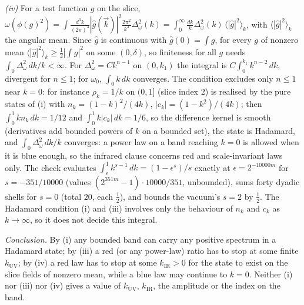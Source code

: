 \emph{(iv)} For a test function $g$ on the slice, $\omega(\phi(g)^{2}) = \int\frac{d^{3}k}{(2\pi)^{3}}|\hat g(\vec k)|^{2}\frac{2\pi^{2}}{k^{3}}\Delta_{\omega}^{2}(k) = \int_{0}^{\infty}\frac{dk}{k}\Delta_{\omega}^{2}(k)\,\langle|\hat g|^{2}\rangle_{k}$, with $\langle|\hat g|^{2}\rangle_{k}$ the angular mean. Since $\hat g$ is continuous with $\hat g(0) = \int g$, for every $g$ of nonzero mean $\langle|\hat g|^{2}\rangle_{k} \ge \tfrac12|\int g|^{2}$ on some $(0, \delta)$, so finiteness for all $g$ needs $\int_{0}\Delta_{\omega}^{2}\,dk/k < \infty$. For $\Delta_{\omega}^{2} = Ck^{n - 1}$ on $(0, k_{1})$ the integral is $C\int_{0}^{k_{1}}k^{n - 2}\,dk$, divergent for $n \le 1$; for $\omega_{0}$, $\int_{0}k\,dk$ converges. The condition excludes only $n \le 1$ near $k = 0$: for instance $\rho_{k} = 1/k$ on $(0, 1]$ (slice index $2$) is realised by the pure states of (i) with $n_{k} = (1 - k)^{2}/(4k)$, $|c_{k}| = (1 - k^{2})/(4k)$; then $\int_{0}^{1}kn_{k}\,dk = 1/12$ and $\int_{0}^{1}k|c_{k}|\,dk = 1/6$, so the difference kernel is smooth (derivatives add bounded powers of $k$ on a bounded set), the state is Hadamard, and $\int_{0}\Delta_{\omega}^{2}\,dk/k$ converges: a power law on a band reaching $k = 0$ is allowed when it is blue enough, so the infrared clause concerns red and scale-invariant laws only. The check evaluates $\int_{\epsilon}^{1}k^{s - 1}\,dk = (1 - \epsilon^{s})/s$ exactly at $\epsilon = 2^{-10000m}$ for $s = -351/10000$ (values $(2^{351m} - 1)\cdot 10000/351$, unbounded), sums forty dyadic shells for $s = 0$ (total $20$, each $\tfrac12$), and bounds the vacuum's $s = 2$ by $\tfrac12$. The Hadamard condition (i) and (iii) involves only the behaviour of $n_{k}$ and $c_{k}$ as $k \to \infty$, so it does not decide this integral.

\emph{Conclusion.} By (i) any bounded band can carry any positive spectrum in a Hadamard state; by (iii) a red (or any power-law) ratio has to stop at some finite $k_{\mathrm{UV}}$; by (iv) a red law has to stop at some $k_{\mathrm{IR}} > 0$ for the state to exist on the slice fields of nonzero mean, while a blue law may continue to $k = 0$. Neither (i) nor (iii) nor (iv) gives a value of $k_{\mathrm{UV}}$, $k_{\mathrm{IR}}$, the amplitude or the index on the band.
